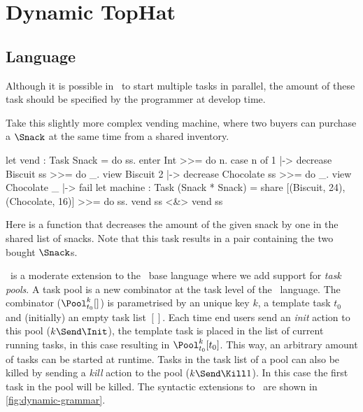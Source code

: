 
\section{Dynamic TopHat}
\label{sec:dyntophat}

\subsection{Language}

Although it is possible in \TOPHAT\ to start multiple tasks in parallel,
the amount of these task should be specified by the programmer at develop time.

\begin{example}
  \label{exm:vending-shared}
  Take this slightly more complex vending machine,
  where two buyers can purchase a $\Snack$ at the same time from a shared inventory.

  \begin{TASK}[]
    let vend : Task Snack = do ss.
      enter Int >>= do n.
      case n of
        1 |-> decrease Biscuit ss >>= do _.
             view Biscuit
        2 |-> decrease Chocolate ss >>= do _.
             view Chocolate
        _ |-> fail
    let machine : Task (Snack * Snack) =
      share [(Biscuit, 24), (Chocolate, 16)] >>= do ss.
      vend ss <&> vend ss
  \end{TASK}

  Here  is a function that decreases the amount of the given snack by one in the shared list of snacks.
  Note that this task results in a pair containing the two bought $\Snack$s.
\end{example}

\DYNTOPHAT\ is a moderate extension to the \TOPHAT\ base language where we add support for \emph{task pools}.
A task pool is a new combinator at the task level of the \TOPHAT\ language.
The combinator ($\Pool^k_{t_0} []$) is parametrised by an unique key $k$, a template task $t_0$ and (initially) an empty task list $[]$.
Each time end users send an \emph{init} action to this pool ($k\Send\Init$),
the template task is placed in the list of current running tasks,
in this case resulting in $\Pool^k_{t_0} [t_0]$.
This way, an arbitrary amount of tasks can be started at runtime.
Tasks in the task list of a pool can also be killed by sending a \emph{kill} action to the pool ($k\Send\Kill1$).
In this case the first task in the pool will be killed.
The syntactic extensions to \TOPHAT\ are shown in \cref{fig:dynamic-grammar}.

